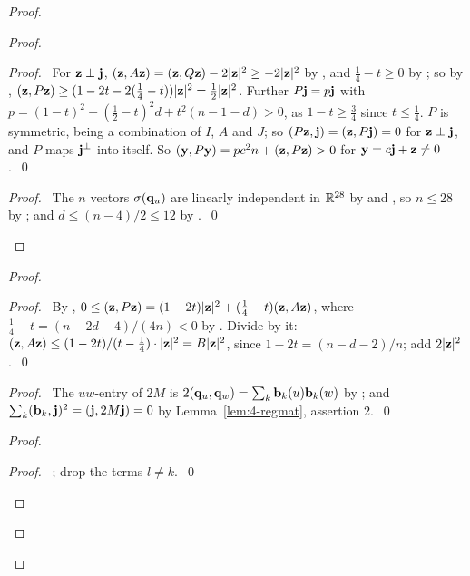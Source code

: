 \begin{proof}
 \begin{proof}
  \begin{proof}\pf\ For ${\mathbf z}\perp{\mathbf j}$, $({\mathbf z},A{\mathbf z})=({\mathbf z},Q{\mathbf z})-2|{\mathbf z}|^2\ge-2|{\mathbf z}|^2$ by
   , and $\frac14-t\ge0$ by ; so by ,
   $({\mathbf z},P{\mathbf z})\ge(1-2t-2(\frac14-t))|{\mathbf z}|^2=\frac12|{\mathbf z}|^2$. Further $P{\mathbf j}=p{\mathbf j}$ with
   $p=(1-t)^2+(\frac12-t)^2d+t^2(n-1-d)>0$, as $1-t\ge\frac34$ since $t\le\frac14$. $P$ is
   symmetric, being a combination of $I$, $A$ and $J$; so $(P{\mathbf z},{\mathbf j})=({\mathbf z},P{\mathbf j})=0$ for
   ${\mathbf z}\perp{\mathbf j}$, and $P$ maps ${\mathbf j}^\perp$ into itself. So
   $({\mathbf y},P{\mathbf y})=pc^2n+({\mathbf z},P{\mathbf z})>0$ for ${\mathbf y}=c{\mathbf j}+{\mathbf z}\ne0$.~\qed\end{proof}
  \qedstep
  \begin{proof}\pf\ The $n$ vectors $\sigma({\mathbf q}_u)$ are linearly independent in ${\mathbb R}^{28}$ by
    and , so $n\le28$ by
   ; and $d\le(n-4)/2\le12$ by
   .~\qed\end{proof}
 \end{proof}
 \begin{proof}
  \begin{proof}\pf\ By , $0\le({\mathbf z},P{\mathbf z})=(1-2t)|{\mathbf z}|^2+(\frac14-t)({\mathbf z},A{\mathbf z})$,
   where $\frac14-t=(n-2d-4)/(4n)<0$ by . Divide by it: $({\mathbf z},A{\mathbf z})\le
   (1-2t)/(t-\frac14)\cdot|{\mathbf z}|^2=B|{\mathbf z}|^2$, since $1-2t=(n-d-2)/n$; add
   $2|{\mathbf z}|^2$.~\qed\end{proof}
  \begin{proof}\pf\ The $uw$-entry of $2M$ is $2({\mathbf q}_u,{\mathbf q}_w)=\sum_k{\mathbf b}_k(u){\mathbf b}_k(w)$ by
   ; and $\sum_k({\mathbf b}_k,{\mathbf j})^2=({\mathbf j},2M{\mathbf j})=0$ by Lemma~\ref{lem:4-regmat},
   assertion 2.~\qed\end{proof}
  \begin{proof}
   \begin{proof}\pf\ ; drop the terms $l\ne k$.~\qed\end{proof}

\end{proof}
\end{proof}
\end{proof}
